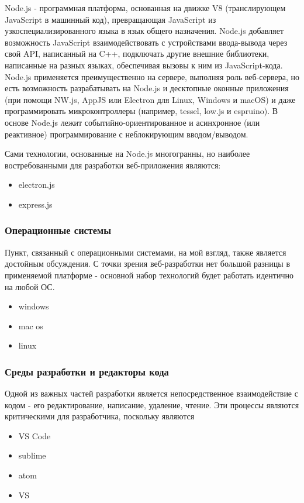         Node.js - программная платформа, основанная на движке V8 (транслирующем JavaScript в машинный код), превращающая JavaScript из узкоспециализированного языка в язык общего назначения.
        Node.js добавляет возможность JavaScript взаимодействовать с устройствами ввода-вывода через свой API, написанный на C++, подключать другие внешние библиотеки, написанные на разных языках, обеспечивая вызовы к ним из JavaScript-кода.
        Node.js применяется преимущественно на сервере, выполняя роль веб-сервера, но есть возможность разрабатывать на Node.js и десктопные оконные приложения (при помощи NW.js, AppJS или Electron для Linux, Windows и macOS) и даже программировать микроконтроллеры (например, tessel, low.js и espruino).
        В основе Node.js лежит событийно-ориентированное и асинхронное (или реактивное) программирование с неблокирующим вводом/выводом. %
        
        Сами технологии, основанные на Node.js многогранны, но наиболее востребованными для разработки веб-приложения являются:
        \begin{itemize}
            \item electron.js
            \item express.js
        \end{itemize}

    
    \subsubsection{Операционные системы}
        Пункт, связанный с операционными системами, на мой взгляд, также является достойным обсуждения.
        С точки зрения веб-разработки нет большой разницы в применяемой платформе - основной набор технологий будет работать идентично на любой ОС.
        \begin{itemize}
            \item windows
            \item mac os
            \item linux
        \end{itemize}
    
        
    \subsubsection{Среды разработки и редакторы кода}
        Одной из важных частей разработки является непосредственное взаимодействие с кодом - его редактирование, написание, удаление, чтение.
        Эти процессы являются критическими для разработчика, поскольку являются 
        \begin{itemize}
            \item VS Code
            \item sublime
            \item atom
            \item VS
        \end{itemize}
    
